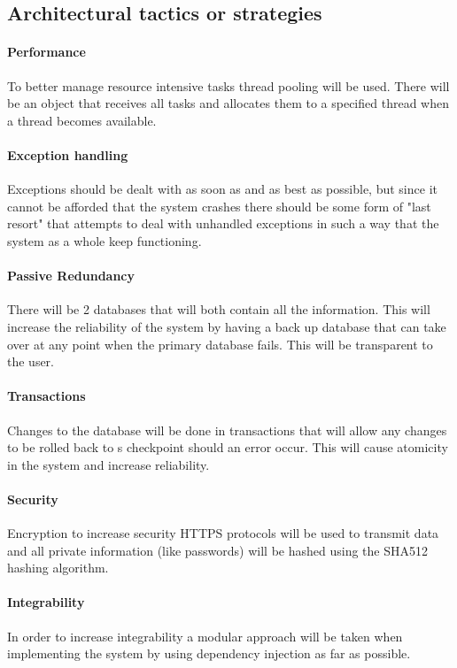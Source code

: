 \documentclass[english]{article}
\begin{document}
		\subsection{Architectural tactics or strategies}
			\paragraph{Performance}\indent
			To better manage resource intensive tasks thread pooling will be used. There will be an object that receives all tasks and allocates them to a specified thread when a thread becomes available.
			
			\paragraph{Exception handling}\indent
			Exceptions should be dealt with as soon as and as best as possible, but since it cannot be afforded that the system crashes there should be some form of "last resort" that attempts to deal with unhandled exceptions in such a way that the system as a whole keep functioning.
			
			\paragraph{Passive Redundancy}\indent
			There will be 2 databases that will both contain all the information. This will increase the reliability of the system by having a back up database that can take over at any point when the primary database fails. This will be transparent to the user.
			
			\paragraph{Transactions}\indent
			Changes to the database will be done in transactions that will allow any changes to be rolled back to s checkpoint should an error occur. This will cause atomicity in the system and increase reliability.
			
			\paragraph{Security}\indent
			Encryption to increase security HTTPS protocols will be used to transmit data and all private information (like passwords) will be hashed using the SHA512 hashing algorithm.
			
			\paragraph{Integrability}\indent
			In order to increase integrability a modular approach will be taken when implementing the system by using dependency injection as far as possible.
			
\end{document}
